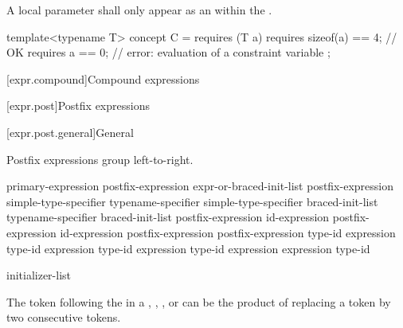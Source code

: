 \pnum
A local parameter shall only appear as an 
within the .
\begin{example}
\begin{codeblock}
template<typename T> concept C = requires (T a) {
  requires sizeof(a) == 4;      // OK
  requires a == 0;              // error: evaluation of a constraint variable
};
\end{codeblock}
\end{example}

[expr.compound]{Compound expressions}

[expr.post]{Postfix expressions}%

[expr.post.general]{General}%

\pnum
Postfix expressions group left-to-right.

\begin{bnf}
\br
    primary-expression\br
    postfix-expression \terminal{[} expr-or-braced-init-list \terminal{]}\br
    postfix-expression \terminal{(}  \terminal{)}\br
    simple-type-specifier \terminal{(}  \terminal{)}\br
    typename-specifier \terminal{(}  \terminal{)}\br
    simple-type-specifier braced-init-list\br
    typename-specifier braced-init-list\br
    postfix-expression   id-expression\br
    postfix-expression \terminal{->}  id-expression\br
    postfix-expression \terminal{++}\br
    postfix-expression \terminal{--}\br
     \terminal{<} type-id \terminal{>} \terminal{(} expression \terminal{)}\br
     \terminal{<} type-id \terminal{>} \terminal{(} expression \terminal{)}\br
     \terminal{<} type-id \terminal{>} \terminal{(} expression \terminal{)}\br
     \terminal{<} type-id \terminal{>} \terminal{(} expression \terminal{)}\br
     \terminal{(} expression \terminal{)}\br
     \terminal{(} type-id \terminal{)}
\end{bnf}

\begin{bnf}
\br
    initializer-list
\end{bnf}

\pnum
\begin{note}
The \tcode{>} token following the
 in a ,
, , or
 can be the product of replacing a
\tcode{>>} token by two consecutive \tcode{>}
tokens.
\end{note}

